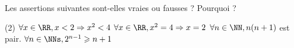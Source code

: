 %
%
	Les assertions suivantes sont-elles vraies ou fausses ?  Pourquoi ?
	\begin{tasks}(2)
		\task $\forall x \in \RR, x < 2 \Rightarrow x^2 < 4$
		\task $\forall x \in \RR, x^2 = 4 \Rightarrow x =2$
		\task $\forall n \in \NN, n(n+1)$ est pair.
		\task $\forall n \in \NNs, 2^{n-1}\geqslant n+1$
	\end{tasks}

